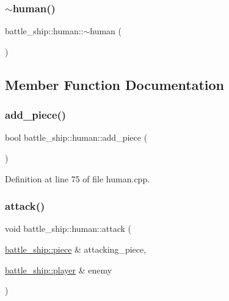 \subsubsection{\texorpdfstring{$\sim$human()}{~human()}}
{\footnotesize\ttfamily battle\+\_\+ship\+::human\+::$\sim$human (\begin{DoxyParamCaption}{ }\end{DoxyParamCaption})\hspace{0.3cm}{\ttfamily [default]}}



\subsection{Member Function Documentation}
\mbox{\label{classbattle__ship_1_1human_adaea883b2eb5fa5932a9d7239c90bfd6}} 
\subsubsection{\texorpdfstring{add\+\_\+piece()}{add\_piece()}}
{\footnotesize\ttfamily bool battle\+\_\+ship\+::human\+::add\+\_\+piece (\begin{DoxyParamCaption}{ }\end{DoxyParamCaption})}



Definition at line 75 of file human.\+cpp.

\mbox{\label{classbattle__ship_1_1human_ad89701f0c4dd688c564b14a015059386}} 
\subsubsection{\texorpdfstring{attack()}{attack()}}
{\footnotesize\ttfamily void battle\+\_\+ship\+::human\+::attack (\begin{DoxyParamCaption}\item[{\hyperlink{classbattle__ship_1_1piece}{battle\+\_\+ship\+::piece} \&}]{attacking\+\_\+piece,  }\item[{\hyperlink{classbattle__ship_1_1player}{battle\+\_\+ship\+::player} \&}]{enemy }\end{DoxyParamCaption})\hspace{0.3cm}{\ttfamily [virtual]}}



